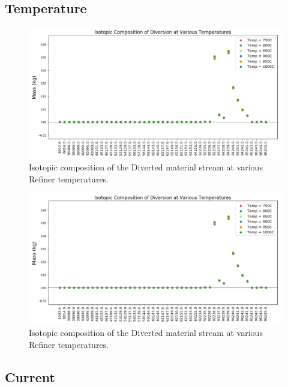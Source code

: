 \subsection{Temperature}

\begin{figure}
	\includegraphics[width=\linewidth]{images/temp-sa-comp}
	\caption{Isotopic composition of the Diverted material stream at various Refiner temperatures.}
	\label{fig:ref-pres-sa}
\end{figure}

\begin{figure}
	\includegraphics[width=\linewidth]{images/temp-sa-comp}
	\caption{Isotopic composition of the Diverted material stream at various Refiner temperatures.}
	\label{fig:ref-pres-diff}
\end{figure}

\subsection{Current}

